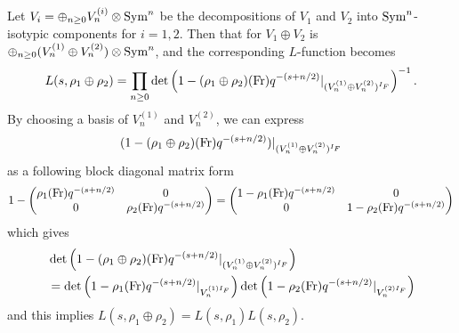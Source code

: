 \begin{problem}
Let $V_i = \oplus_{n \geq 0} V_{n}^{(i)} \otimes \operatorname{\mathrm{Sym}}^{n}$ be the decompositions of $V_1$ and $V_2$
into $\operatorname{\mathrm{Sym}}^n$-isotypic components for $i = 1, 2$.
Then that for $V_1 \oplus V_2$ is $\oplus_{n \geq 0} (V_n^{(1)} \oplus V_n^{(2)}) \otimes \operatorname{\mathrm{Sym}}^n$, and the
corresponding $L$-function becomes
$$
L(s, \rho_1 \oplus \rho_2) = \prod_{n \geq 0} \det\left(1 - (\rho_1 \oplus \rho_2)(\operatorname{\mathrm{Fr}})q^{-(s + n/2)}|_{(V_{n}^{(1)} \oplus V_{n}^{(2)})^{I_F}}\right)^{-1}.
$$
By choosing a basis of $V_n^{(1)}$ and $V_n^{(2)}$, we can express 
$$
(1 - (\rho_1 \oplus \rho_2)(\operatorname{\mathrm{Fr}})q^{-(s+n/2)})|_{(V_n^{(1)} \oplus V_{n}^{(2)})^{I_F}}
$$
as a following block diagonal matrix form
$$
1 - \begin{pmatrix}
    \rho_1(\operatorname{\mathrm{Fr}}) q^{-(s+n/2)} & 0 \\ 0 & \rho_2(\operatorname{\mathrm{Fr}}) q^{-(s+n/2)}
\end{pmatrix}
= \begin{pmatrix}
    1 - \rho_1(\operatorname{\mathrm{Fr}}) q^{-(s+n/2)} & 0 \\ 0 & 1 - \rho_2(\operatorname{\mathrm{Fr}}) q^{-(s+n/2)}
\end{pmatrix}
$$
which gives
\begin{align*}
&\det \left(1 - (\rho_1 \oplus \rho_2)(\operatorname{\mathrm{Fr}})q^{-(s+n/2)}|_{(V_n^{(1)} \oplus V_{n}^{(2)})^{I_F}}\right) \\
&= \det\left(1 - \rho_1(\operatorname{\mathrm{Fr}})q^{-(s + n/2)}|_{V_{n}^{(1)I_F}}\right) \det\left(1 - \rho_2(\operatorname{\mathrm{Fr}})q^{-(s + n/2)}|_{V_{n}^{(2)I_F}}\right)
\end{align*}
and this implies $L(s, \rho_1 \oplus \rho_2) = L(s, \rho_1) L(s, \rho_2)$.
\end{problem}

\begin{problem} \notfinish
\end{problem}

\begin{problem} \notfinish
\end{problem}

\begin{problem} \notfinish
\end{problem}

\begin{problem} \notfinish
\end{problem}

\begin{problem} \notfinish
\end{problem}